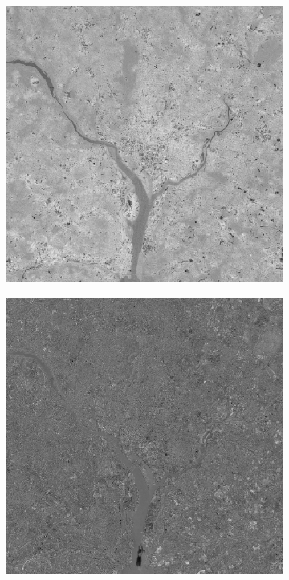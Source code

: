 \begin{figure}[h!]
\begin{subfigure}[b]{0.3\linewidth}
		\caption{}
		\label{fig:10different2}
	\end{subfigure}
	\begin{subfigure}[b]{0.3\linewidth}
		\includegraphics[width=\linewidth]{myfigure/p10/10_different_3.png}
		\caption{}
		\label{fig:10different3}
	\end{subfigure}
	\begin{subfigure}[b]{0.3\linewidth}
		\includegraphics[width=\linewidth]{myfigure/p10/10_different_4.png}

\end{subfigure}
\end{figure}
